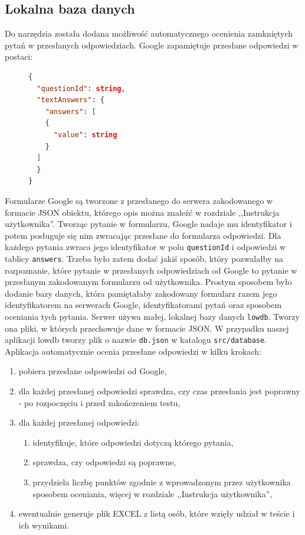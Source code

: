 \subsection{Lokalna baza danych}
Do narzędzia została dodana możliwość automatycznego ocenienia zamkniętych pytań w 
przesłanych odpowiedziach. Google zapamiętuje przesłane odpowiedzi w postaci:
\begin{figure}[H]
  \begin{lstlisting}[language=json,firstnumber=1]
{
  "questionId": string,
  "textAnswers": {
    "answers": [
    {
      "value": string
    }
  ]
  }
}
  \end{lstlisting}
\end{figure}
Formularze Google są tworzone z przesłanego do serwera zakodowanego w formacie JSON obiektu,
którego opis można znaleźć w rozdziale ,,Instrukcja użytkownika''.
Tworząc pytanie w formularzu, Google nadaje mu identyfikator i potem posługuje się nim
zwracając przesłane do formularza odpowiedzi. Dla każdego pytania zwraca jego identyfikator 
w polu \texttt{questionId} i odpowiedzi w tablicy \texttt{answers}. Trzeba było zatem dodać
jakiś sposób, który pozwalałby na rozpoznanie, które pytanie w przesłanych odpowiedziach od 
Google to pytanie w przesłanym zakodowanym formularzu od użytkownika. Prostym sposobem było
dodanie bazy danych, która pamiętałaby zakodowany formularz razem jego identyfikatorem 
na serwerach Google, identyfikatorami pytań oraz sposobem oceniania tych pytania. Serwer
używa małej, lokalnej bazy
danych \texttt{lowdb}. Tworzy ona pliki, w których przechowuje dane w formacie JSON.
W przypadku naszej aplikacji lowdb tworzy plik o nazwie \texttt{db.json} w katalogu 
\texttt{src/database}. Aplikacja automatycznie ocenia przesłane odpowiedzi w kilku krokach:
\begin{enumerate}
  \item pobiera przesłane odpowiedzi od Google,
  \item dla każdej przesłanej odpowiedzi sprawdza, czy czas przesłania jest poprawny - po 
    rozpoczęciu i przed zakończeniem testu,
  \item dla każdej przesłanej odpowiedzi:
    \begin{enumerate}
      \item identyfikuje, które odpowiedzi dotyczą którego pytania,
      \item sprawdza, czy odpowiedzi są poprawne,
      \item przydziela liczbę punktów zgodnie z wprowadzonym przez użytkownika sposobem
        oceniania, więcej w rozdziale ,,Instrukcja użytkownika'',
    \end{enumerate}
  \item ewentualnie generuje plik EXCEL z listą osób, które wzięły udział w teście
    i ich wynikami.
\end{enumerate}

